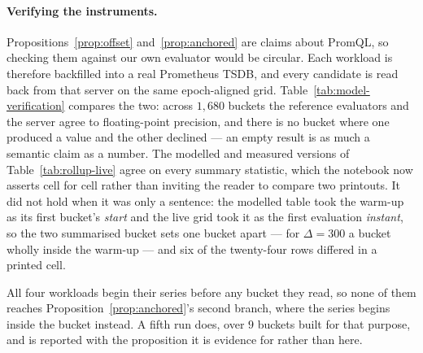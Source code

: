 \paragraph{Verifying the instruments.}
Propositions~\ref{prop:offset} and~\ref{prop:anchored} are claims about PromQL, so
checking them against our own evaluator would be circular. Each workload is therefore
backfilled into a real Prometheus TSDB, and every candidate is read back from that server
on the same epoch-aligned grid. Table~\ref{tab:model-verification} compares the two: across
$1{,}680$ buckets the reference evaluators and the server agree to floating-point
precision, and there is no bucket where one produced a value and the other declined ---
an empty result is as much a semantic claim as a number. The modelled and measured
versions of Table~\ref{tab:rollup-live} agree on every summary statistic, which the
notebook now asserts cell for cell rather than inviting the reader to compare two
printouts. It did not hold when it was only a sentence: the modelled table took the
warm-up as its first bucket's \emph{start} and the live grid took it as the first
evaluation \emph{instant}, so the two summarised bucket sets one bucket apart --- for
$\Delta=300$ a bucket wholly inside the warm-up --- and six of the twenty-four rows
differed in a printed cell.

All four workloads begin their series before any bucket they read, so none of them
reaches Proposition~\ref{prop:anchored}'s second branch, where the series begins inside
the bucket instead. A fifth run does, over $9$ buckets built for that purpose, and is
reported with the proposition it is evidence for rather than here.

\begin{table}[htbp]\centering\footnotesize

\caption{The reference evaluators of \texttt{semantics/promql\_eval.py} against
Prometheus~3.15.0 on identical samples. ``NaN mismatch'' counts buckets where exactly one
of the two returned a value.}
\label{tab:model-verification}
\end{table}
